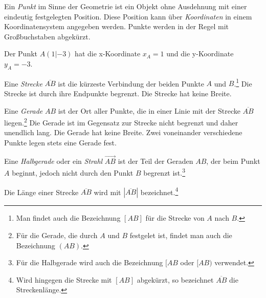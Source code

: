 \begin{defi}[Punkt]
 Ein \emph{Punkt} im Sinne der Geometrie ist ein Objekt ohne Ausdehnung mit einer eindeutig festgelegten Position. Diese Position kann über \emph{Koordinaten} in einem Koordinatensystem angegeben werden. Punkte werden in der Regel mit Großbuchstaben abgekürzt.
\end{defi}

\begin{bsp}
 Der Punkt \(A(1|-3)\) hat die x-Koordinate \(x_A=1\) und die y-Koordinate \(y_A=-3\).
\end{bsp}

\begin{defi}
 Eine \emph{Strecke} \(\overline{AB}\) ist die kürzeste Verbindung der beiden Punkte \(A\) und \(B\).\footnote{Man findet auch die Bezeichnung \([AB]\) für die Strecke von \(A\) nach \(B\).} Die Strecke ist durch ihre Endpunkte begrenzt. Die Strecke hat keine Breite.
 
 Eine \emph{Gerade} \(AB\) ist der Ort aller Punkte, die in einer Linie mit der Strecke \(\overline{AB}\) liegen.\footnote{Für die Gerade, die durch \(A\) und \(B\) festgelet ist, findet man auch die Bezeichnung \((AB)\).} Die Gerade ist im Gegensatz zur Strecke nicht begrenzt und daher unendlich lang. Die Gerade hat keine Breite. Zwei voneinander verschiedene Punkte legen stets eine Gerade fest.
 
 Eine \emph{Halbgerade} oder ein \emph{Strahl} \(\overrightarrow{AB}\) ist der Teil der Geraden \(AB\), der beim Punkt \(A\) beginnt, jedoch nicht durch den Punkt \(B\) begrenzt ist.\footnote{Für die Halbgerade wird auch die Bezeichnung \([AB\) oder \([AB)\) verwendet.}
\end{defi}

\begin{defi}
 Die Länge einer Strecke \(\overline{AB}\) wird mit \(\left| \overline{AB}\right| \) bezeichnet.\footnote{Wird hingegen die Strecke mit \([AB]\) abgekürzt, so bezeichnet \(\overline{AB}\) die Streckenlänge.}
\end{defi}


